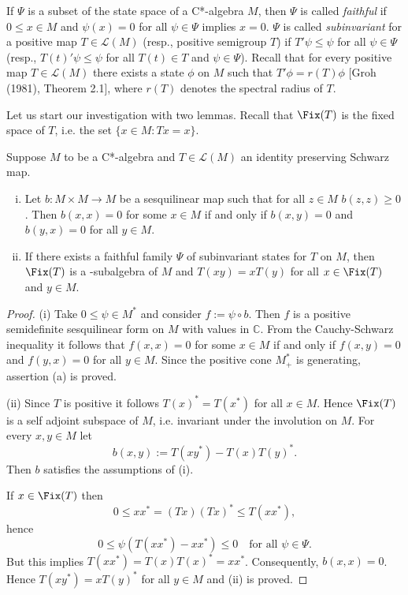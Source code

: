 If $\Psi$ is a subset of the state space of a C*-algebra $M$, then $\Psi$ is called \emph{faithful} if $0 \leq x\in M$ and $\psi(x) = 0$ for all $\psi\in\Psi$ implies $x = 0$.
$\Psi$ is called \emph{subinvariant} for a positive map $T\in\mathcal{L}(M)$ (resp., positive semigroup $T$) if $T'\psi \leq \psi$ for all $\psi\in\Psi$ (resp., $T(t)'\psi \leq \psi$ for all $T(t)\in T$ and $\psi\in\Psi$).
Recall that for every positive map $T\in\mathcal{L}(M)$ there exists a state $\phi$ on $M$ such that $T'\phi = r(T)\phi$ [Groh (1981), Theorem 2.1], where $r(T)$ denotes the spectral radius of $T$.

Let us start our investigation with two lemmas.
Recall that $\Fix(T)$ is the fixed space of $T$, i.e. the set $\{x\in M: Tx=x\}$.


\begin{lemma}\label{lem:d3-1.1}
Suppose $M$ to be a C*-algebra and $T\in\mathcal{L}(M)$ an identity preserving Schwarz map.

\begin{enumerate}[(i)]
\item Let $b: M\times M \to M$ be a sesquilinear map such that for all $z\in M$ $b(z,z) \geq 0$.
Then $b(x,x) = 0$ for some $x\in M$ if and only if $b(x,y) = 0$ and $b(y,x) = 0$ for all $y\in M$.

\item If there exists a faithful family $\Psi$ of subinvariant states for $T$ on $M$, then $\Fix(T)$ is a \CA-subalgebra of $M$ and $T(xy) = xT(y)$ for all $x\in\Fix(T)$ and $y\in M$.

\end{enumerate}
\end{lemma}
\begin{proof} 
(i) Take $0 \leq \psi\in M^*$ and consider $f := \psi\circ b$.
Then $f$ is a positive semidefinite sesquilinear form on $M$ with values in $\mathbb{C}$.
From the Cauchy-Schwarz inequality it follows that $f(x,x) = 0$ for some $x\in M$ if and only if $f(x,y) = 0$ and $f(y,x) = 0$ for all $y\in M$.
Since the positive cone $M^*_{+}$ is generating, assertion (a) is proved.

(ii) Since $T$ is positive it follows $T(x)^* = T(x^*)$ for all $x\in M$.
Hence $\Fix(T)$ is a self adjoint subspace of $M$, i.e. invariant under the involution on $M$.
For every $x,y\in M$ let
\[
	b(x,y) := T(xy^*) - T(x)T(y)^*.
\]
Then $b$ satisfies the assumptions of (i).

If $x\in\Fix(T)$ then
\[
0 \leq xx^* = (Tx)(Tx)^* \leq T(xx^*),
\]
hence
\[
0 \leq \psi(T(xx^*) - xx^*) \leq 0 \quad \text{for all } \psi\in\Psi.
\]
But this implies $T(xx^*) = T(x)T(x)^* = xx^*$.
Consequently, $b(x,x) = 0$.
Hence $T(xy^*) = xT(y)^*$ for all $y\in M$ and (ii) is proved.
\end{proof}

